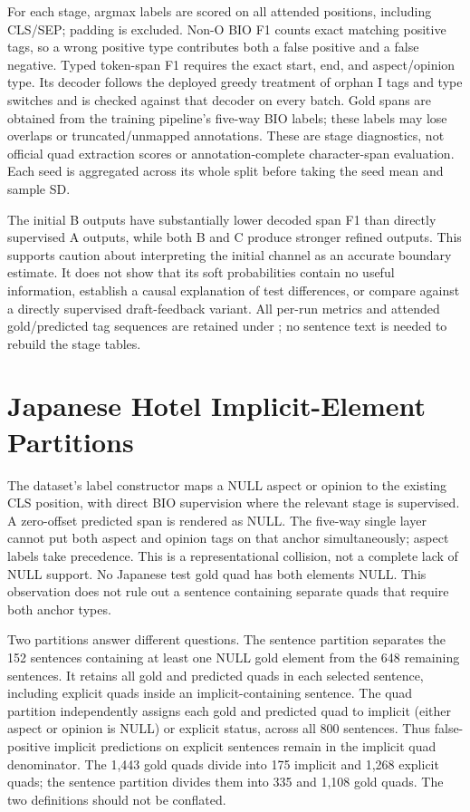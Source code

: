 \documentclass[10pt]{article}
\begin{document}
For each stage, argmax labels are scored on all attended positions, including CLS/SEP; padding is excluded. Non-O BIO F1 counts exact matching positive tags, so a wrong positive type contributes both a false positive and a false negative. Typed token-span F1 requires the exact start, end, and aspect/opinion type. Its decoder follows the deployed greedy treatment of orphan I tags and type switches and is checked against that decoder on every batch. Gold spans are obtained from the training pipeline's five-way BIO labels; these labels may lose overlaps or truncated/unmapped annotations. These are stage diagnostics, not official quad extraction scores or annotation-complete character-span evaluation. Each seed is aggregated across its whole split before taking the seed mean and sample SD.


The initial B outputs have substantially lower decoded span F1 than directly supervised A outputs, while both B and C produce stronger refined outputs. This supports caution about interpreting the initial channel as an accurate boundary estimate. It does not show that its soft probabilities contain no useful information, establish a causal explanation of test differences, or compare against a directly supervised draft-feedback variant. All per-run metrics and attended gold/predicted tag sequences are retained under ; no sentence text is needed to rebuild the stage tables.
\FloatBarrier
\section{Japanese Hotel Implicit-Element Partitions}
The dataset's label constructor maps a NULL aspect or opinion to the existing CLS position, with direct BIO supervision where the relevant stage is supervised. A zero-offset predicted span is rendered as NULL. The five-way single layer cannot put both aspect and opinion tags on that anchor simultaneously; aspect labels take precedence. This is a representational collision, not a complete lack of NULL support. No Japanese test gold quad has both elements NULL. This observation does not rule out a sentence containing separate quads that require both anchor types.

Two partitions answer different questions. The sentence partition separates the 152 sentences containing at least one NULL gold element from the 648 remaining sentences. It retains all gold and predicted quads in each selected sentence, including explicit quads inside an implicit-containing sentence. The quad partition independently assigns each gold and predicted quad to implicit (either aspect or opinion is NULL) or explicit status, across all 800 sentences. Thus false-positive implicit predictions on explicit sentences remain in the implicit quad denominator. The 1,443 gold quads divide into 175 implicit and 1,268 explicit quads; the sentence partition divides them into 335 and 1,108 gold quads. The two definitions should not be conflated.
\end{document}
